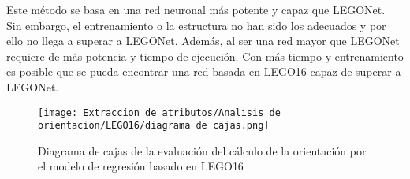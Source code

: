 Este método se basa en una red neuronal más potente y capaz que LEGONet. Sin embargo, el entrenamiento o la estructura no han sido los adecuados y por ello no llega a superar a LEGONet. Además, al ser una red mayor que LEGONet requiere de más potencia y tiempo de ejecución. Con más tiempo y entrenamiento es posible que se pueda encontrar una red basada en LEGO16 capaz de superar a LEGONet.

\begin{figure}[ht] %
	\centering
	\texttt{[image: Extraccion de atributos/Analisis de orientacion/LEGO16/diagrama de cajas.png]}
	\caption[Diagrama de cajas de la orientación mediante LEGO16]{Diagrama de cajas de la evaluación del cálculo de la orientación por el modelo de regresión basado en LEGO16}
	\label{fig:cajas LEGO16}
	\vspace{-5pt}
\end{figure}
